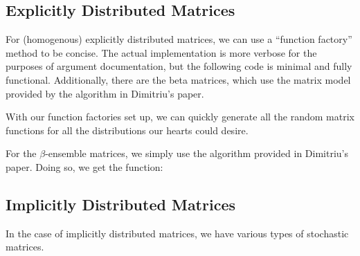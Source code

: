 \subsection{Explicitly Distributed Matrices}

For (homogenous) explicitly distributed matrices, we can use a ``function factory'' method to be concise. The actual implementation is more verbose for the purposes of argument documentation, but the following code is minimal and fully functional. Additionally, there are the beta matrices, which use the matrix model provided by the algorithm in Dimitriu's paper.



With our function factories set up, we can quickly generate all the random matrix functions for all the distributions our hearts could desire.




For the $\beta$-ensemble matrices, we simply use the algorithm provided in Dimitriu's paper. Doing so, we get the function:


\subsection{Implicitly Distributed Matrices}

In the case of implicitly distributed matrices, we have various types of stochastic matrices.


